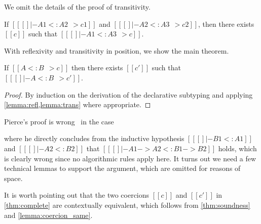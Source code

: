 We omit the details of the proof of transitivity.

\begin{lemma}[Transitivity] \label{lemma:trans}
  If $[[ [] |- A1 <: A2 ~~> c1]]$ and $[[ [] |- A2 <: A3 ~~> c2]]$, then there
  exists $[[c]]$ such that $[[ [] |- A1 <: A3 ~~> c]]$.
\end{lemma}

With reflexivity and transitivity in position, we show the main theorem.

\begin{theorem}[Completeness] \label{thm:complete}
  If $[[A <: B ~~> c]]$ then there exists $[[c']]$ such that $[[ [] |- A <: B ~~> c']]$.
\end{theorem}
\begin{proof}
  By induction on the derivation of the declarative subtyping and applying \cref{lemma:refl,lemma:trans} where appropriate.
\end{proof}
\begin{remark}
  Pierce's proof is wrong~\cite[pp.~20, Case~F]{pierce1989decision} in the case
  \begin{mathpar}
  \end{mathpar}
  where he directly concludes from the inductive hypothesis $[[ [] |- B1 <:
  A1]]$ and $[[ [] |- A2 <: B2]]$ that $[[ [] |- A1 -> A2 <: B1 -> B2]]$ holds,
  which is clearly wrong since no algorithmic rules apply here. It turns out we
  need a few technical lemmas to support the argument, which are omitted for 
  reasons of space.
\end{remark}

\begin{remark}
  It is worth pointing out that the two coercions $[[c]]$ and $[[c']]$ in
  \cref{thm:complete} are contextually equivalent, which follows from
  \cref{thm:soundness} and \cref{lemma:coercion_same}.
\end{remark}

